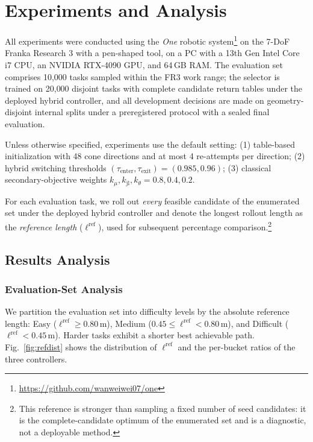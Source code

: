 \documentclass[journal]{IEEEtran}
\newcommand{\nEval}{10{,}000}
\newcommand{\nTrain}{20{,}000}
\begin{document}
\section{Experiments and Analysis}
\label{sec:exp}
All experiments were conducted using the \textit{One} robotic
system\footnote{\url{https://github.com/wanweiwei07/one}} on the 7-DoF
Franka Research 3 with a pen-shaped tool, on a PC with a 13th Gen Intel
Core i7 CPU, an NVIDIA RTX-4090 GPU, and 64\,GB RAM. The evaluation set
comprises \nEval{} tasks sampled within the FR3 work range; the selector
is trained on \nTrain{} disjoint tasks with complete candidate return
tables under the deployed hybrid controller, and all development
decisions are made on geometry-disjoint internal splits under a
preregistered protocol with a sealed final evaluation.

Unless otherwise specified, experiments use the default setting:
(1) table-based initialization with 48 cone directions and at most 4
re-attempts per direction; (2) hybrid switching thresholds
$(\tau_{\mathrm{enter}},\tau_{\mathrm{exit}})=(0.985,0.96)$;
(3) classical secondary-objective weights
$k_{\mu},k_{\mathrm{jl}},k_{\theta}=0.8,0.4,0.2$.

For each evaluation task, we roll out \textit{every} feasible candidate
of the enumerated set under the deployed hybrid controller and denote
the longest rollout length as the \textit{reference length}
($\ell^{\mathrm{ref}}$), used for subsequent percentage
comparison.\footnote{This reference is stronger than sampling a fixed
number of seed candidates: it is the complete-candidate optimum of the
enumerated set and is a diagnostic, not a deployable method.}

\subsection{Results Analysis}

\subsubsection{Evaluation-Set Analysis}
We partition the evaluation set into difficulty levels by the absolute
reference length: Easy ($\ell^{\mathrm{ref}}\geq0.80$\,m), Medium
($0.45\leq\ell^{\mathrm{ref}}<0.80$\,m), and Difficult
($\ell^{\mathrm{ref}}<0.45$\,m). Harder tasks exhibit a shorter best
achievable path. Fig.~\ref{fig:refdist} shows the distribution of
$\ell^{\mathrm{ref}}$ and the per-bucket ratios of the three
controllers.
\end{document}
